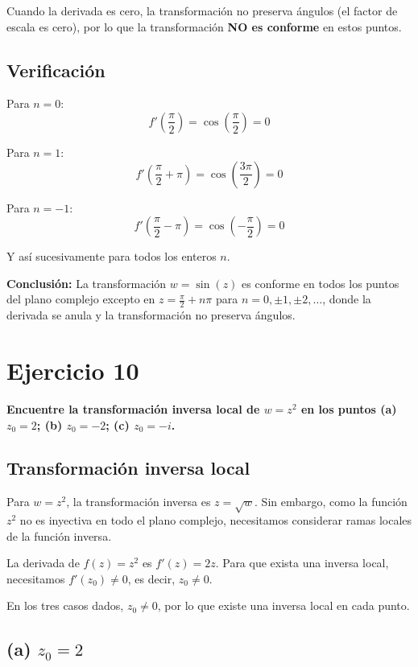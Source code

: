 \documentclass{article}
\begin{document}
Cuando la derivada es cero, la transformación no preserva ángulos (el factor de escala es cero), por lo que la transformación \textbf{NO es conforme} en estos puntos.

\subsection*{Verificación}

Para $n = 0$:
$$f'\left(\frac{\pi}{2}\right) = \cos\left(\frac{\pi}{2}\right) = 0$$

Para $n = 1$:
$$f'\left(\frac{\pi}{2} + \pi\right) = \cos\left(\frac{3\pi}{2}\right) = 0$$

Para $n = -1$:
$$f'\left(\frac{\pi}{2} - \pi\right) = \cos\left(-\frac{\pi}{2}\right) = 0$$

Y así sucesivamente para todos los enteros $n$.

\textbf{Conclusión:} La transformación $w = \sin(z)$ es conforme en todos los puntos del plano complejo excepto en $z = \frac{\pi}{2} + n\pi$ para $n = 0, \pm 1, \pm 2, \ldots$, donde la derivada se anula y la transformación no preserva ángulos.

\section*{Ejercicio 10}

\textbf{Encuentre la transformación inversa local de $w = z^2$ en los puntos (a) $z_0 = 2$; (b) $z_0 = -2$; (c) $z_0 = -i$.}

\subsection*{Transformación inversa local}

Para $w = z^2$, la transformación inversa es $z = \sqrt{w}$. Sin embargo, como la función $z^2$ no es inyectiva en todo el plano complejo, necesitamos considerar ramas locales de la función inversa.

La derivada de $f(z) = z^2$ es $f'(z) = 2z$. Para que exista una inversa local, necesitamos $f'(z_0) \neq 0$, es decir, $z_0 \neq 0$.

En los tres casos dados, $z_0 \neq 0$, por lo que existe una inversa local en cada punto.

\subsection*{(a) $z_0 = 2$}
\end{document}
